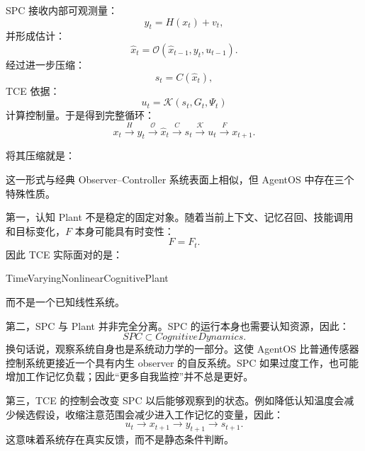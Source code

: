 SPC 接收内部可观测量：
\begin{equation}
y_t
=
H(x_t)+v_t,
\end{equation}
并形成估计：
\begin{equation}
\hat{x}_{t}
=
\mathcal{O}
\left(
\hat{x}_{t-1},
y_t,
u_{t-1}
\right).
\end{equation}
经过进一步压缩：
\begin{equation}
s_t
=
C(\hat{x}_t),
\end{equation}
TCE 依据：
\begin{equation}
u_t
=
\mathcal{K}
\left(
s_t,
G_t,
\Psi_t
\right)
\label{eq:tce-control-law}
\end{equation}
计算控制量。于是得到完整循环：
\begin{equation}
x_t
\xrightarrow{H}
y_t
\xrightarrow{\mathcal O}
\hat{x}_t
\xrightarrow{C}
s_t
\xrightarrow{\mathcal K}
u_t
\xrightarrow{F}
x_{t+1}.
\label{eq:spc-tce-closed-loop}
\end{equation}

将其压缩就是：
\begin{statementbox}
\centering
{}
\end{statementbox}

这一形式与经典 Observer--Controller 系统表面上相似，但 AgentOS 中存在三个特殊性质。

第一，认知 Plant 不是稳定的固定对象。随着当前上下文、记忆召回、技能调用和目标变化，$F$ 本身可能具有时变性：
\begin{equation}
F=F_t.
\end{equation}
因此 TCE 实际面对的是：
\begin{statementbox}
TimeVaryingNonlinearCognitivePlant
\end{statementbox}
而不是一个已知线性系统。

第二，SPC 与 Plant 并非完全分离。SPC 的运行本身也需要认知资源，因此：
\begin{equation}
SPC
\subset
CognitiveDynamics.
\end{equation}
换句话说，观察系统自身也是系统动力学的一部分。这使 AgentOS 比普通传感器控制系统更接近一个具有内生 observer 的自反系统。SPC 如果过度工作，也可能增加工作记忆负载；因此``更多自我监控''并不总是更好。

第三，TCE 的控制会改变 SPC 以后能够观察到的状态。例如降低认知温度会减少候选假设，收缩注意范围会减少进入工作记忆的变量，因此：
\begin{equation}
u_t
\rightarrow
x_{t+1}
\rightarrow
y_{t+1}
\rightarrow
s_{t+1}.
\end{equation}
这意味着系统存在真实反馈，而不是静态条件判断。

